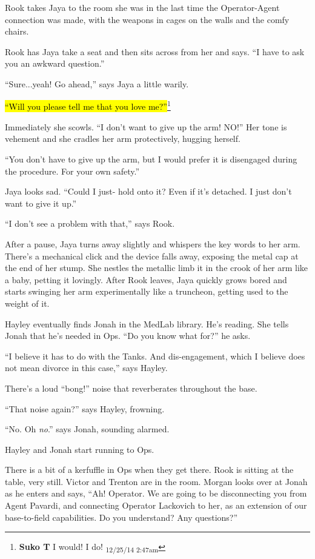 Rook takes Jaya to the room she was in the last time the Operator-Agent connection was made, with the weapons in cages on the walls and the comfy chairs.

Rook has Jaya take a seat and then sits across from her and says.  ``I have to ask you an awkward question.''

``Sure...yeah! Go ahead,'' says Jaya a little warily.

\hl{``Will you please tell me that you love me?''}\footnote{\textbf{Suko T }I would!  I do! \textsubscript{12/25/14 2:47am}}

Immediately she scowls.  ``I don't want to give up the arm!  NO!'' Her tone is vehement and she cradles her arm protectively, hugging herself.

``You don't have to give up the arm, but I would prefer it is disengaged during the procedure.  For your own safety.''

Jaya looks sad.  ``Could I just- hold onto it?  Even if it's detached.  I just don't want to give it up.''

``I don't see a problem with that,'' says Rook.

After a pause, Jaya turns away slightly and whispers the key words to her arm.  There's a mechanical click and the device falls away, exposing the metal cap at the end of her stump.  She nestles the metallic limb it in the crook of her arm like a baby, petting it lovingly.  After Rook leaves, Jaya quickly grows bored and starts swinging her arm experimentally like a truncheon, getting used to the weight of it.





Hayley eventually finds Jonah in the MedLab library.  He's reading.  She tells Jonah that he's needed in Ops.  ``Do you know what for?'' he asks.

``I believe it has to do with the Tanks.  And dis-engagement, which I believe does not mean divorce in this case,'' says Hayley.

There's a loud ``bong!'' noise that reverberates throughout the base. 

``That noise again?'' says Hayley, frowning.

``No.  Oh \textit{no}.'' says Jonah, sounding alarmed.

Hayley and Jonah start running to Ops.



There is a bit of a kerfuffle in Ops when they get there.  Rook is sitting at the table, very still.  Victor and Trenton are in the room.  Morgan looks over at Jonah as he enters and says, ``Ah!  Operator.  We are going to be disconnecting you from Agent Pavardi, and connecting Operator Lackovich to her, as an extension of our base-to-field capabilities. Do you understand?  Any questions?''

